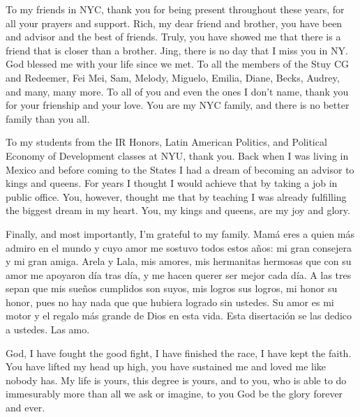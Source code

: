 To my friends in NYC, thank you for being present throughout these years, for all your prayers and support. Rich, my dear friend and brother, you have been and advisor and the best of friends. Truly, you have showed me that there is a friend that is closer than a brother. Jing, there is no day that I miss you in NY. God blessed me with your life since we met. To all the members of the Stuy CG and Redeemer, Fei Mei, Sam, Melody, Miguelo, Emilia, Diane, Becks, Audrey, and many, many more. To all of you and even the ones I don't name, thank you for your frienship and your love. You are my NYC family, and there is no better family than you all. 

To my students from the IR Honors, Latin American Politics, and Political Economy of Development classes at NYU, thank you. Back when I was living in Mexico and before coming to the States I had a dream of becoming an advisor to kings and queens. For years I thought I would achieve that by taking a job in public office. You, however, thought me that by teaching I was already fulfilling the biggest dream in my heart. You, my kings and queens, are my joy and glory. 

Finally, and most importantly, I'm grateful to my family. Mamá eres a quien más admiro en el mundo y cuyo amor me sostuvo todos estos años: mi gran consejera y mi gran amiga. Arela y Lala, mis amores, mis hermanitas hermosas que con su amor me apoyaron día tras día, y me hacen querer ser mejor cada día. A las tres sepan que mis sueños cumplidos son suyos, mis logros sus logros, mi honor su honor, pues no hay nada que que hubiera logrado sin ustedes. Su amor es mi motor y el regalo más grande de Dios en esta vida. Esta disertación se las dedico a ustedes. Las amo.

God, I have fought the good fight, I have finished the race, I have kept the faith. You have lifted my head up high, you have sustained me and loved me like nobody has. My life is yours, this degree is yours, and to you, who is able to do immesurably more than all we ask or imagine, to you God be the glory forever and ever. 

\noindent
{}
\makebox[\textwidth]{\hfill\makebox[3in]{\hfill\graddate\hfill}}

